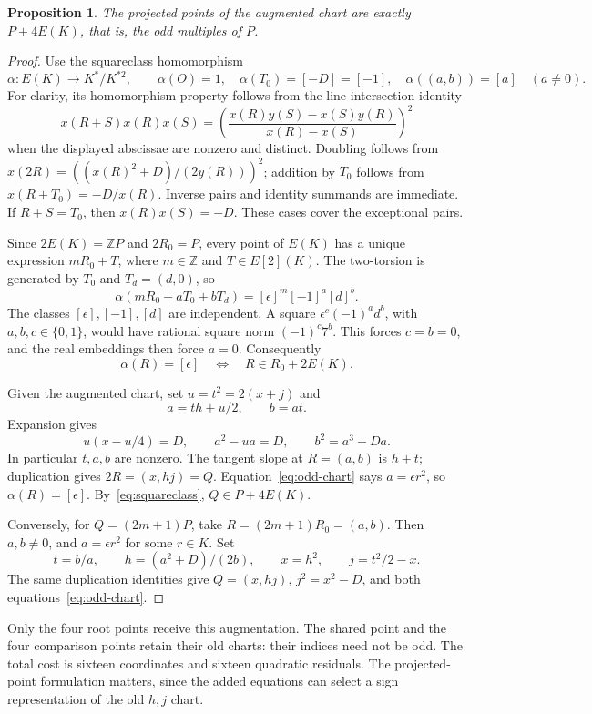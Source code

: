 \documentclass[11pt]{article}
\newtheorem{proposition}[theorem]{Proposition}
\newcommand{\Z}{\mathbb Z}
\begin{document}
\begin{proposition}\label{prop:odd-chart}
The projected points of the augmented chart are exactly $P+4E(K)$, that is, the odd multiples of $P$.
\end{proposition}
\begin{proof}
Use the squareclass homomorphism
\[
 \alpha:E(K)\longrightarrow K^*/K^{*2},\qquad
 \alpha(O)=1,\quad \alpha(T_0)=[-D]=[-1],\quad
 \alpha((a,b))=[a]\quad(a\ne0).
\]
For clarity, its homomorphism property follows from the line-intersection identity
\[
 x(R+S)x(R)x(S)=
 \left(\frac{x(R)y(S)-x(S)y(R)}{x(R)-x(S)}\right)^2
\]
when the displayed abscissae are nonzero and distinct. Doubling follows from
$x(2R)=((x(R)^2+D)/(2y(R)))^2$; addition by $T_0$ follows from $x(R+T_0)=-D/x(R)$. Inverse pairs and identity summands are immediate. If $R+S=T_0$, then $x(R)x(S)=-D$. These cases cover the exceptional pairs.

Since $2E(K)=\Z P$ and $2R_0=P$, every point of $E(K)$ has a unique expression $mR_0+T$, where $m\in\Z$ and $T\in E[2](K)$. The two-torsion is generated by $T_0$ and $T_d=(d,0)$, so
\[
 \alpha(mR_0+aT_0+bT_d)=[\epsilon]^m[-1]^a[d]^b.
\]
The classes $[\epsilon],[-1],[d]$ are independent. A square $\epsilon^c(-1)^a d^b$, with $a,b,c\in\{0,1\}$, would have rational square norm $(-1)^c7^b$. This forces $c=b=0$, and the real embeddings then force $a=0$. Consequently
\begin{equation}\label{eq:squareclass}
 \alpha(R)=[\epsilon]\quad\Longleftrightarrow\quad R\in R_0+2E(K).
\end{equation}

Given the augmented chart, set $u=t^2=2(x+j)$ and
\[
 a=th+u/2,\qquad b=at.
\]
Expansion gives
\[
 u(x-u/4)=D,\qquad a^2-ua=D,\qquad b^2=a^3-Da.
\]
In particular $t,a,b$ are nonzero. The tangent slope at $R=(a,b)$ is $h+t$; duplication gives $2R=(x,hj)=Q$. Equation~\eqref{eq:odd-chart} says $a=\epsilon r^2$, so $\alpha(R)=[\epsilon]$. By~\eqref{eq:squareclass}, $Q\in P+4E(K)$.

Conversely, for $Q=(2m+1)P$, take $R=(2m+1)R_0=(a,b)$. Then $a,b\ne0$, and $a=\epsilon r^2$ for some $r\in K$. Set
\[
 t=b/a,\qquad h=(a^2+D)/(2b),\qquad x=h^2,
 \qquad j=t^2/2-x.
\]
The same duplication identities give $Q=(x,hj)$, $j^2=x^2-D$, and both equations~\eqref{eq:odd-chart}.
\end{proof}

Only the four root points receive this augmentation. The shared point and the four comparison points retain their old charts: their indices need not be odd. The total cost is sixteen coordinates and sixteen quadratic residuals. The projected-point formulation matters, since the added equations can select a sign representation of the old $h,j$ chart.
\end{document}
